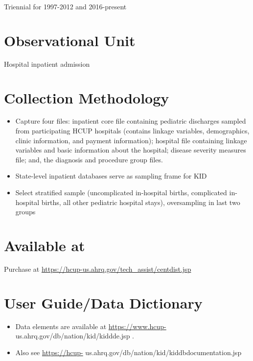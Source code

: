 \documentclass[
]{book}
\providecommand{\tightlist}{%
  \setlength{\itemsep}{0pt}\setlength{\parskip}{0pt}}
\begin{document}
Triennial for 1997-2012 and 2016-present

\hypertarget{observational-unit-36}{%
\section{Observational Unit}\label{observational-unit-36}}

Hospital inpatient admission

\hypertarget{collection-methodology-36}{%
\section{Collection Methodology}\label{collection-methodology-36}}

\begin{itemize}
\tightlist
\item
  Capture four files: inpatient core file containing pediatric discharges sampled from participating HCUP hospitals (contains linkage variables, demographics, clinic information, and payment information); hospital file containing linkage variables and basic information about the hospital; disease severity measures file; and, the diagnosis and procedure group files.
\item
  State-level inpatient databases serve as sampling frame for KID
\item
  Select stratified sample (uncomplicated in-hospital births, complicated in-hospital births, all other pediatric hospital stays), oversampling in last two groups
\end{itemize}

\hypertarget{available-at-36}{%
\section{Available at}\label{available-at-36}}

Purchase at \url{https://hcup-us.ahrq.gov/tech_assist/centdist.jsp}

\hypertarget{user-guidedata-dictionary-36}{%
\section{User Guide/Data Dictionary}\label{user-guidedata-dictionary-36}}

\begin{itemize}
\tightlist
\item
  Data elements are available at \url{https://www.hcup-} us.ahrq.gov/db/nation/kid/kiddde.jsp .
\item
  Also see \url{https://hcup-} us.ahrq.gov/db/nation/kid/kiddbdocumentation.jsp
\end{itemize}
\end{document}
